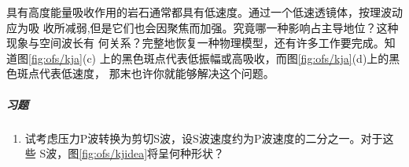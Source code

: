 具有高度能量吸收作用的岩石通常都具有低速度。通过一个低速透镜体，按理波动应为吸
收所减弱,但是它们也会因聚焦而加强。究竟哪一种影响占主导地位？这种现象与空间波长有
何关系？完整地恢复一种物理模型，还有许多工作要完成。知道图\ref{fig:ofs/kja}(c)
上的黑色斑点代表低振幅或高吸收，而图\ref{fig:ofs/kja}(d)上的黑色斑点代表低速度，
那末也许你就能够解决这个问题。

\subparagraph{习题}
\label{sec:3.1.4}

\begin{enumerate}
\item   试考虑压力P波转换为剪切S波，设S波速度约为P波速度的二分之一。对于这些
  S波，图\ref{fig:ofs/kjidea}将呈何种形状？
\end{enumerate}
